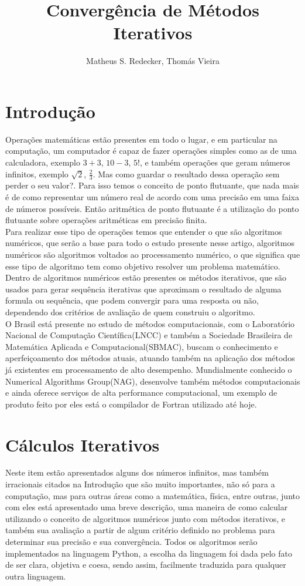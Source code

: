 \documentclass[12pt]{article}
\title{Convergência de Métodos Iterativos}
\author{Matheus S. Redecker\inst{1}, Thomás Vieira\inst{1}}
\begin{document}
 

\maketitle
\section{Introdução}
Operações matemáticas estão presentes em todo o lugar, e em particular na computação, um computador é capaz de fazer operações simples como as de uma calculadora, exemplo $3+3$, $10-3$, $5!$, e também operações que geram números infinitos, exemplo $\sqrt{2}$, $\frac{2}{3}$. Mas como guardar o resultado dessa operação sem perder o seu valor?. Para isso temos o conceito de ponto flutuante, que nada mais é de como representar um número real de acordo com uma precisão em uma faixa de números possíveis. Então aritmética de ponto flutuante é a utilização do ponto flutuante sobre operações aritméticas em precisão finita. \\
Para realizar esse tipo de operações temos que entender o que são algoritmos numéricos, que serão a base para todo o estudo presente nesse artigo, algoritmos numéricos são algoritmos voltados ao processamento numérico\cite{Dalcidio:00}, o que significa que esse tipo de algoritmo tem como objetivo resolver um problema matemático. 
Dentro de algoritmos numéricos estão presentes os métodos iterativos, que são usados para gerar sequência iterativas que aproximam o resultado de alguma formula ou sequência, que podem convergir para uma resposta ou não, dependendo dos critérios de avaliação de quem construiu o algoritmo. \\
O Brasil está presente no estudo de métodos computacionais, com o Laboratório Nacional de Computação Científica(LNCC) e também a Sociedade Brasileira de Matemática Aplicada e Computacional(SBMAC), buscam o conhecimento e aperfeiçoamento dos métodos atuais, atuando também na aplicação dos métodos já existentes em processamento de alto desempenho. Mundialmente conhecido o Numerical Algorithms Group(NAG), desenvolve também métodos computacionais e ainda oferece serviços de alta performance computacional, um exemplo de produto feito por eles está o compilador de Fortran utilizado até hoje.

\section{Cálculos Iterativos}
Neste item estão apresentados alguns dos números infinitos, mas também irracionais citados na Introdução que são muito importantes, não só para a computação, mas para outras áreas como a matemática, física, entre outras, junto com eles está apresentado uma breve descrição, uma maneira de como calcular utilizando o conceito de algoritmos numéricos junto com métodos iterativos, e também sua avaliação a partir de algum critério definido no problema para determinar sua precisão e sua convergência. Todos os algoritmos serão implementados na linguagem Python, a escolha da linguagem foi dada pelo fato de ser clara, objetiva e coesa, sendo assim, facilmente traduzida para qualquer outra linguagem.  
\end{document}
